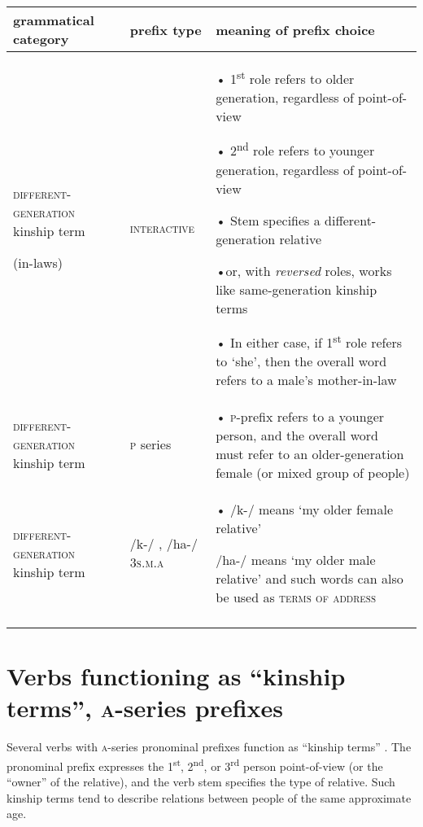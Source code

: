 \begin{table}[t]
{
\begin{tabularx}{\textwidth}{p{2cm}lQ}

\lsptoprule
grammatical category & prefix type & meaning of prefix choice\\
\midrule


\textsc{different-generation} kinship term

(in-laws) & \textsc{interactive} & • 1\textsuperscript{st} role refers to older generation, regardless of point-of-view

• 2\textsuperscript{nd} role refers to younger generation, regardless of point-of-view

• Stem specifies a different-generation relative

•or, with \emph{reversed} roles, works like same-generation kinship terms

• In either case, if 1\textsuperscript{st} role refers to ‘she’, then the overall word refers to a male’s mother-in-law\\

\midrule
\textsc{different-generation} kinship term & \textsc{p}{} series & • \textsc{p}{}-prefix refers to a younger person, and the overall word must refer to an older-generation female (or mixed group of people)\\

\midrule
\textsc{different-generation} kinship term & /k-/ , /ha-/ \textsc{3s.m.a} & • /k-/ means ‘my older female relative’

/ha-/ means ‘my older male relative’ and such words can also be used as \textsc{terms of address}\\
\lspbottomrule
\end{tabularx}}
\end{table}


\clearpage
\section{Verbs functioning as “kinship terms”, \textsc{a}-series prefixes} \label{ch:Verbs functioning as ‘kinship terms’, a-series pronominal prefixes}
Several verbs with \textsc{a}-series pronominal prefixes function as “kinship terms” . The pronominal prefix expresses the 1\textsuperscript{st}, 2\textsuperscript{nd}, or 3\textsuperscript{rd} person point-of-view (or the “owner” of the relative), and the verb stem specifies the type of relative. Such kinship terms tend to describe relations between people of the same approximate age.


